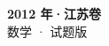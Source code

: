 \documentclass[zihao=-4, a4paper]{ctexart}
\begin{document}
\begin{center}
  {\Large\bfseries 2012 年·江苏卷}\\[4pt]
  {\large 数学 · 试题版}
\end{center}
\medskip
{}

\end{document}
